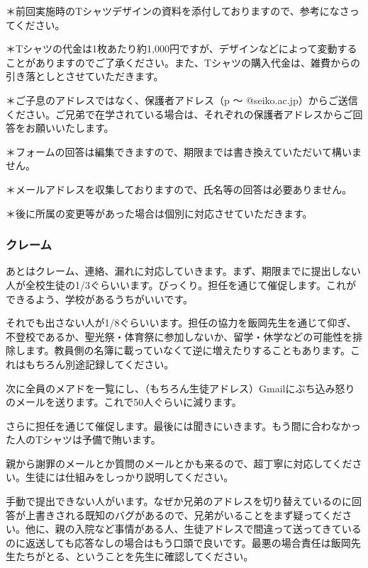 \documentclass[dvipdfmx,jb5]{jreport}
\begin{document}
＊前回実施時のTシャツデザインの資料を添付しておりますので、参考になさってください。

＊Tシャツの代金は1枚あたり約1,000円ですが、デザインなどによって変動することがありますのでご了承ください。また、Tシャツの購入代金は、雑費からの引き落としとさせていただきます。

＊ご子息のアドレスではなく、保護者アドレス（p 〜 @seiko.ac.jp）からご送信ください。ご兄弟で在学されている場合は、それぞれの保護者アドレスからご回答をお願いいたします。

＊フォームの回答は編集できますので、期限までは書き換えていただいて構いません。

＊メールアドレスを収集しておりますので、氏名等の回答は必要ありません。

＊後に所属の変更等があった場合は個別に対応させていただきます。
\\

\subsubsection{クレーム}
あとはクレーム、連絡、漏れに対応していきます。まず、期限までに提出しない人が全校生徒の1/3ぐらいいます。びっくり。担任を通じて催促します。これができるよう、学校があるうちがいいです。

それでも出さない人が1/8ぐらいいます。担任の協力を飯岡先生を通じて仰ぎ、不登校であるか、聖光祭・体育祭に参加しないか、留学・休学などの可能性を排除します。教員側の名簿に載っていなくて逆に増えたりすることもあります。これはもちろん別途記録してください。

次に全員のメアドを一覧にし、（もちろん生徒アドレス）Gmailにぶち込み怒りのメールを送ります。これで50人ぐらいに減ります。

さらに担任を通じて催促します。最後には聞きにいきます。もう間に合わなかった人のTシャツは予備で賄います。

親から謝罪のメールとか質問のメールとかも来るので、超丁寧に対応してください。生徒には仕組みをしっかり説明してください。

手動で提出できない人がいます。なぜか兄弟のアドレスを切り替えているのに回答が上書きされる既知のバグがあるので、兄弟がいることをまず疑ってください。他に、親の入院など事情がある人、生徒アドレスで間違って送ってきているのに返送しても応答なしの場合はもう口頭で良いです。最悪の場合責任は飯岡先生たちがとる、ということを先生に確認してください。
\end{document}
